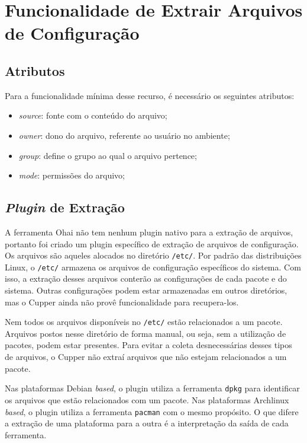 \section{Funcionalidade de Extrair Arquivos de Configuração}
\label{sec:files}

\subsection{Atributos}

Para a funcionalidade mínima desse recurso, é necessário os seguintes
atributos:

\begin{itemize}
  \item \textit{source}: fonte com o conteúdo do arquivo;
  \item \textit{owner}: dono do arquivo, referente ao usuário no ambiente;
  \item \textit{group}: define o grupo ao qual o arquivo pertence;
  \item \textit{mode}: permissões do arquivo;
\end{itemize}

\subsection{\textit{Plugin} de Extração}

A ferramenta Ohai não tem nenhum plugin nativo para a extração de arquivos, portanto
foi criado um plugin específico de extração de arquivos de configuração. Os arquivos
são aqueles alocados no diretório \texttt{/etc/}. Por padrão das distribuições Linux,
o \texttt{/etc/} armazena os arquivos de configuração específicos do sistema.
Com isso, a extração desses arquivos conterão as configurações de cada pacote e do
sistema. Outras configurações podem estar armazenadas em outros diretórios,
mas o Cupper ainda não provê funcionalidade para recupera-los. %

Nem todos os arquivos disponíveis no \texttt{/etc/} estão relacionados a um pacote.
Arquivos postos nesse diretório de forma manual, ou seja, sem a utilização de pacotes,
podem estar presentes. Para evitar a coleta desnecessárias desses tipos de arquivos,
o Cupper não extraí arquivos que não estejam relacionados a um pacote.

Nas plataformas Debian \textit{based}, o plugin utiliza a ferramenta \texttt{dpkg}
para identificar os arquivos que estão relacionados com um pacote. Nas plataformas
Archlinux \textit{based}, o plugin utiliza a ferramenta \texttt{pacman} com o mesmo propósito.
O que difere a extração de uma plataforma para a outra é a interpretação da saída
de cada ferramenta.

